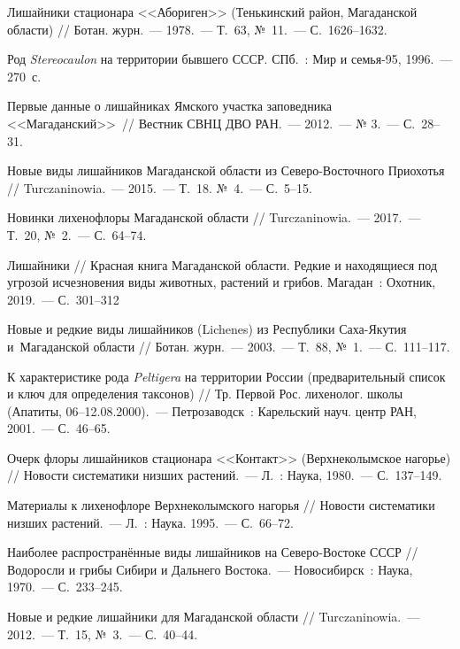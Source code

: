 \begin{thebibliography}{99}
\bibitem{} Лишайники стационара <<Абориген>> (Тенькинский район, Магаданской области) // Ботан. журн.~--- 1978.~--- Т.~63, №~11.~--- С.~1626--1632.

\bibitem{} Род \textit{Stereocaulon} на территории бывшего СССР. СПб.~: Мир и семья-95, 1996.~--- 270~с.

\bibitem{} Первые данные о лишайниках Ямского участка заповедника <<Магаданский>>~// Вестник СВНЦ ДВО РАН.~--- 2012.~--- № 3.~--- С.~28--31.

\bibitem{} Новые виды лишайников Магаданской области из Северо-Восточного Приохотья // Turczaninowia.~--- 2015.~--- Т.~18. №~4.~--- С.~5--15.

\bibitem{} Новинки лихенофлоры Магаданской области // Turczaninowia.~--- 2017.~--- Т.~20, №~2.~--- С.~64--74.

\bibitem{} Лишайники // Красная книга Магаданской области. Редкие и находящиеся под угрозой исчезновения виды животных, растений и грибов. Магадан~: Охотник, 2019.~--- С.~301--312

\bibitem{} Новые и редкие виды лишайников (Lichenes) из Республики Саха-Якутия и~Магаданской области // Ботан. журн.~--- 2003.~--- Т.~88, №~1.~--- С.~111--117.

\bibitem{} К характеристике рода \textit{Peltigera} на территории России (предварительный список и ключ для определения таксонов) // Тр. Первой Рос. лихенолог. школы (Апатиты, 06–12.08.2000).~--- Петрозаводск~: Карельский науч. центр РАН, 2001.~--- С.~46--65.

\bibitem{} Очерк флоры лишайников стационара <<Контакт>> (Верхнеколымское нагорье) // Новости систематики низших растений.~--- Л.~: Наука, 1980.~--- С.~137--149.

\bibitem{} Материалы к лихенофлоре Верхнеколымского нагорья // Новости систематики низших растений.~--- Л.~: Наука. 1995.~--- С.~66--72.

\bibitem{} Наиболее распространённые виды лишайников на Северо-Востоке СССР // Водоросли и грибы Сибири и Дальнего Востока.~--- Новосибирск~: Наука, 1970.~--- С.~233--245.

\bibitem{} Новые и редкие лишайники для Магаданской области // Turczaninowia.~--- 2012.~--- Т.~15, №~3.~--- С.~40--44.


\end{thebibliography}
